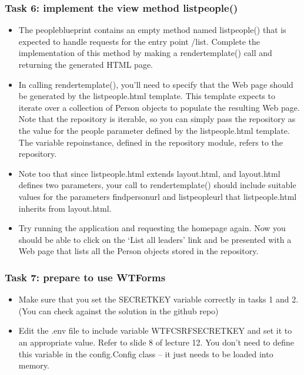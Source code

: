 \documentclass{beamer}
\begin{document}
	\begin{frame}
		\frametitle{Task 6: implement the view method list\textunderscore{}people() }
		\begin{itemize}
			\item The people\textunderscore{}blueprint contains an empty method named list\textunderscore{}people() that is expected to handle requests for the entry point /list. Complete the implementation of this method by making a render\textunderscore{}template() call and returning the generated HTML page.

			\item In calling render\textunderscore{}template(), you’ll need to specify that the Web page should be generated by the list\textunderscore{}people.html template. This template expects to iterate over a collection of Person objects to populate the resulting Web page. Note that the repository is iterable, so you can simply pass the repository as the value for the people parameter defined by the list\textunderscore{}people.html template. The variable repo\textunderscore{}instance, defined in the repository module, refers to the repository.
		\end{itemize}
	\end{frame}

	\begin{frame}
	    \begin{itemize}
			\item Note too that since list\textunderscore{}people.html extends layout.html, and layout.html defines two parameters, your call to render\textunderscore{}template() should include suitable values for the parameters find\textunderscore{}person\textunderscore{}url and list\textunderscore{}people\textunderscore{}url that list\textunderscore{}people.html inherits from layout.html.

			\item Try running the application and requesting the homepage again. Now you should be able to click on the ‘List all leaders’ link and be presented with a Web page that lists all the Person objects stored in the repository.

		\end{itemize}
	\end{frame}

	\begin{frame}
		\frametitle{Task 7: prepare to use WTForms}
		\begin{itemize}
			\item Make sure that you set the SECRET\textunderscore{}KEY variable correctly in tasks 1 and 2. (You can check against the solution in the github repo)

			\item Edit the .env file to include variable WTF\textunderscore{}CSRF\textunderscore{}SECRET\textunderscore{}KEY and set it to an appropriate value. Refer to slide 8 of lecture 12. You don’t need to define this variable in the config.Config class – it just needs to be loaded into memory.
		\end{itemize}
	\end{frame}
\end{document}
